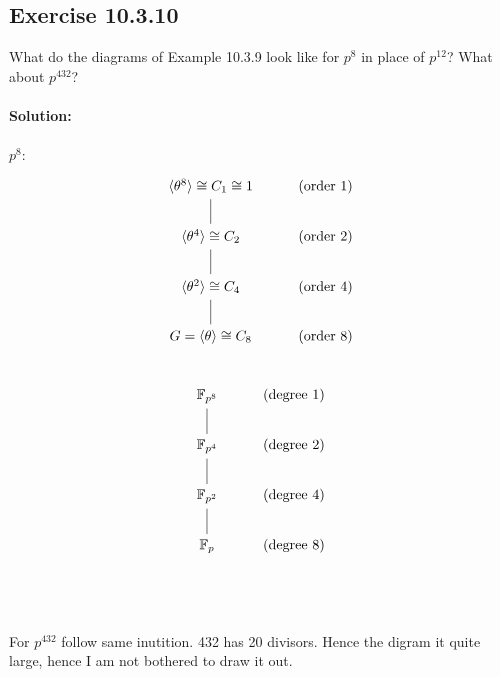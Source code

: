 \documentclass{article}
\begin{document}
\subsection*{Exercise 10.3.10}
What do the diagrams of Example 10.3.9 look like for $p^8$ in place of $p^{12}$?
What about $p^{432}$?
\\\\
\textbf{Solution:}
\\\\
$p^8$:
\begin{equation*}
    \begin{tikzcd}
        \langle \theta^{8} \rangle \cong C_1 \cong 1  \arrow[d, dash] & (\text{order 1}) \\
        \langle \theta^{4} \rangle \cong C_2 \arrow[d, dash] & (\text{order 2}) \\
        \langle \theta^{2} \rangle \cong C_4 \arrow[d, dash] & (\text{order 4}) \\
        G = \langle \theta \rangle \cong C_{8} & (\text{order 8}) \\
    \end{tikzcd}
\end{equation*}
\begin{equation*}
    \begin{tikzcd}
        \mathbb{F}_{p^{8}} \arrow[d, dash]& (\text{degree 1}) \\
        \mathbb{F}_{p^4} \arrow[d, dash]& (\text{degree 2}) \\
        \mathbb{F}_{p^2} \arrow[d, dash]& (\text{degree 4}) \\
        \mathbb{F}_{p}& (\text{degree 8})\\
    \end{tikzcd}
\end{equation*}
\\\\
For $p^{432}$ follow same inutition. 432 has 20 divisors. Hence the digram it quite large, hence I am not bothered
to draw it out.
\end{document}

